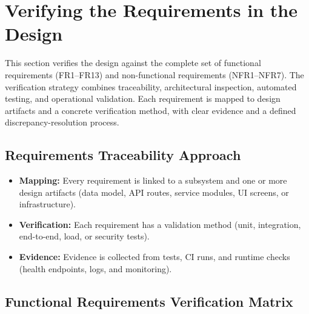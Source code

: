 \section{Verifying the Requirements in the Design}

This section verifies the design against the complete set of functional requirements (FR1--FR13) and non-functional requirements (NFR1--NFR7). The verification strategy combines traceability, architectural inspection, automated testing, and operational validation. Each requirement is mapped to design artifacts and a concrete verification method, with clear evidence and a defined discrepancy-resolution process.

\subsection{Requirements Traceability Approach}

\begin{itemize}
    \item \textbf{Mapping:} Every requirement is linked to a subsystem and one or more design artifacts (data model, API routes, service modules, UI screens, or infrastructure).
    \item \textbf{Verification:} Each requirement has a validation method (unit, integration, end-to-end, load, or security tests).
    \item \textbf{Evidence:} Evidence is collected from tests, CI runs, and runtime checks (health endpoints, logs, and monitoring).
\end{itemize}

\subsection{Functional Requirements Verification Matrix}

